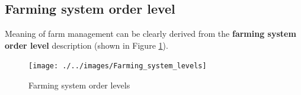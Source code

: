 \documentclass[11pt,]{book}
\theoremstyle{definition}
\theoremstyle{definition}
\theoremstyle{definition}
\theoremstyle{remark}
\begin{document}
\subsection{Farming system order
level}\label{farming-system-order-level}

Meaning of farm management can be clearly derived from the
\textbf{farming system order level} description (shown in Figure
\ref{fig:fs-order-level}).

\begin{figure}

{\centering \texttt{[image: ./../images/Farming\_system\_levels]} 

}

\caption{Farming system order levels}\label{fig:fs-order-level}
\end{figure}
\end{document}
